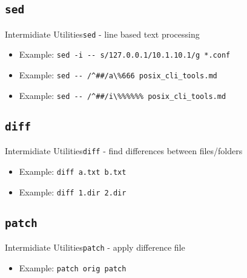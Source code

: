 \documentclass[aspectratio=169]{beamer}
\begin{document}
\subsection{\tt sed}
\begin{frame}{Intermidiate Utilities}{\texttt{sed} - line based text processing}

\begin{itemize}[<+->]
\item
  Example:
  \texttt{sed\ -i\ -\/-\ \textquotesingle{}s/127.0.0.1/10.1.10.1/g\textquotesingle{}\ *.conf}
\item
  Example:
  \texttt{sed\ -\/-\ \textquotesingle{}/\^{}\#\#/a\textbackslash{}\%666\textquotesingle{}\ posix\_cli\_tools.md}
\item
  Example:
  \texttt{sed\ -\/-\ \textquotesingle{}/\^{}\#\#/i\textbackslash{}\%\%\%\%\%\%\textquotesingle{}\ posix\_cli\_tools.md}
\end{itemize}

\end{frame}

\subsection{\tt diff}
\begin{frame}{Intermidiate Utilities}{\texttt{diff} - find differences between files/folders}
    \begin{itemize}
        \item
            Example:
            \texttt{diff\ a.txt\ b.txt}
        \item
            Example:
            \texttt{diff\ 1.dir\ 2.dir}
    \end{itemize}
\end{frame}

\subsection{\tt patch}
\begin{frame}{Intermidiate Utilities}{\texttt{patch} - apply difference file}
    \begin{itemize}
        \item
            Example:
            \texttt{patch orig patch}
    \end{itemize}
\end{frame}
\end{document}
